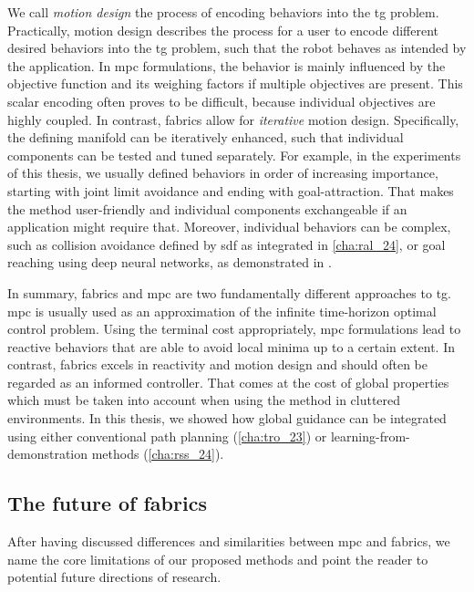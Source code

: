We call \textit{motion design} the process of encoding
behaviors into the \ac{tg} problem. Practically, motion
design describes the 
process for a user to encode different desired behaviors
into the \ac{tg} problem, such that the robot behaves as
intended by the application. In \ac{mpc} formulations,
the behavior is mainly influenced by the objective function
and its weighing factors if multiple objectives are present.
This scalar encoding often proves to be difficult, because
individual objectives are highly coupled. In contrast,
\ac{fabrics} allow for \textit{iterative} motion design.
Specifically, the defining manifold can be iteratively
enhanced, such that individual components can be tested and
tuned separately. For example, in the experiments of this
thesis, we usually defined behaviors in order of
increasing importance, starting with joint limit avoidance
and ending with goal-attraction. That makes the method
user-friendly and individual components exchangeable if an
application might require that. Moreover, individual
behaviors can be complex, such as collision avoidance
defined by \ac{sdf} as integrated in \cref{cha:ral_24},
or goal reaching using
deep neural networks, as demonstrated in \cite{xie2023neural}.

In summary, \ac{fabrics} and \ac{mpc} are two fundamentally
different approaches to \ac{tg}. \Ac{mpc} is usually used as
an approximation of the infinite time-horizon optimal
control problem. Using the terminal cost appropriately,
\ac{mpc} formulations lead to reactive behaviors that are
able to avoid local minima up to a certain extent. In
contrast, \ac{fabrics} excels in reactivity and motion
design and should often be regarded as an informed
controller. That comes at the cost of global properties
which must be taken into account when using the method in
cluttered environments. In this thesis, we showed how global
guidance can be integrated using either conventional
path planning (\cref{cha:tro_23}) or learning-from-demonstration methods
(\cref{cha:rss_24}).

\subsection{The future of \ac{fabrics}}
\label{sec:discussion_limitations_of_fabrics}

After having discussed differences and similarities between
\ac{mpc} and \ac{fabrics}, we name the core limitations of
our proposed methods and point the reader to potential
future directions of research. 

